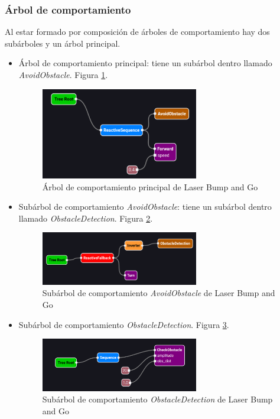 \subsubsection{Árbol de comportamiento}
Al estar formado por composición de árboles de comportamiento hay dos subárboles y un árbol principal.

\begin{itemize}
    \item Árbol de comportamiento principal: tiene un subárbol dentro llamado \textit{AvoidObstacle}. Figura \ref{fig:lbg-1}.
    \begin{figure}[H]
        \centering
        \includegraphics[width=0.65\textwidth]{figures/validation/BumpAndGo_1.png}
        \caption{Árbol de comportamiento principal de Laser Bump and Go}
        \label{fig:lbg-1}
    \end{figure}
    \item Subárbol de comportamiento \textit{AvoidObstacle}: tiene un subárbol dentro llamado \textit{ObstacleDetection}. Figura \ref{fig:lbg-2}.
    \begin{figure}[H]
        \centering
        \includegraphics[width=0.65\textwidth]{figures/validation/BumpAndGo_2.png}
        \caption{Subárbol de comportamiento \textit{AvoidObstacle} de Laser Bump and Go}
        \label{fig:lbg-2}
    \end{figure}
    \item Subárbol de comportamiento \textit{ObstacleDetection}. Figura \ref{fig:lbg-3}.
    \begin{figure}[H]
        \centering
        \includegraphics[width=0.65\textwidth]{figures/validation/BumpAndGo_3.png}
        \caption{Subárbol de comportamiento \textit{ObstacleDetection} de Laser Bump and Go}
        \label{fig:lbg-3}
    \end{figure}
\end{itemize}

